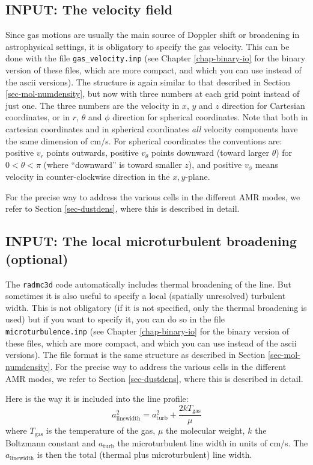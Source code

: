 \documentclass{report}
\begin{document}
\subsection{INPUT: The velocity field}
\label{sec-velo-field}
%
Since gas motions are usually the main source of Doppler shift or broadening
in astrophysical settings, it is obligatory to specify the gas velocity.
This can be done with the file {\small\tt gas\_velocity.inp} (see Chapter
\ref{chap-binary-io} for the binary version of these files, which are more
compact, and which you can use instead of the ascii versions). The structure
is again similar to that described in Section \ref{sec-mol-numdensity}, but
now with three numbers at each grid point instead of just one. The three
numbers are the velocity in $x$, $y$ and $z$ direction for Cartesian
coordinates, or in $r$, $\theta$ and $\phi$ direction for spherical
coordinates. Note that both in cartesian coordinates and in spherical
coordinates {\em all} velocity components have the same dimension of
cm/s. For spherical coordinates the conventions are: positive $v_r$ points
outwards, positive $v_\theta$ points downward (toward larger $\theta$) for
$0<\theta<\pi$ (where ``downward'' is toward smaller $z$), and positive
$v_\phi$ means velocity in counter-clockwise direction in the $x,y$-plane.

For the precise way to address the various cells in the different AMR modes,
we refer to Section \ref{sec-dustdens}, where this is described in detail.


\subsection{INPUT: The local microturbulent broadening (optional)}
\label{sec-turb-broadening}
%
The {\small\tt radmc3d} code automatically includes thermal broadening of
the line. But sometimes it is also useful to specify a local (spatially
unresolved) turbulent width. This is not obligatory (if it is not specified,
only the thermal broadening is used) but if you want to specify it, you can
do so in the file {\small\tt microturbulence.inp} (see Chapter
\ref{chap-binary-io} for the binary version of these files, which are more
compact, and which you can use instead of the ascii versions). The file
format is the same structure as described in Section
\ref{sec-mol-numdensity}. For the precise way to address the various cells
in the different AMR modes, we refer to Section \ref{sec-dustdens}, where
this is described in detail.

Here is the way it is included into the line profile:
\begin{equation}
a_{\mathrm{linewidth}}^2 = a^2_{\mathrm{turb}} + \frac{2kT_{\mathrm{gas}}}{\mu}
\end{equation}
where $T_{\mathrm{gas}}$ is the temperature of the gas, $\mu$ the molecular
weight, $k$ the Boltzmann constant and $a_{\mathrm{turb}}$ the microturbulent
line width in units of cm/s. The $a_{\mathrm{linewidth}}$ is then the total
(thermal plus microturbulent) line width.
\end{document}
